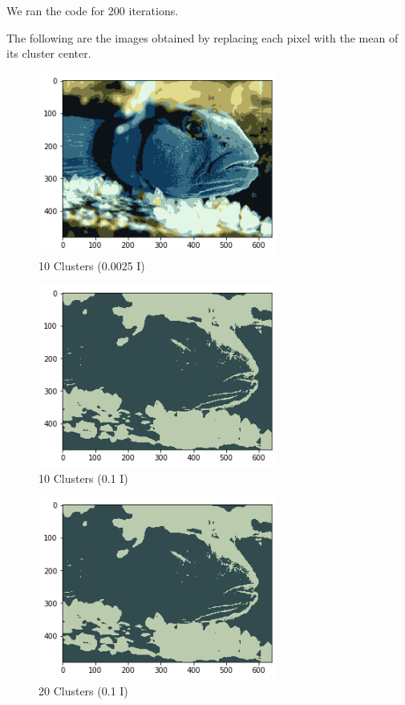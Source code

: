 \documentclass{article}      %
\begin{document}
We ran the code for 200 iterations. 

The following are the images obtained by replacing each pixel with the mean of its cluster center. 

\begin{figure}[H]
\centering
\includegraphics[width=0.7\textwidth]{fish_partc_means_10_400}
\caption{10 Clusters (0.0025 I)}
\end{figure}

\begin{figure}[H]
\centering
\includegraphics[width=0.7\textwidth]{fish_partc_means_10}
\caption{10 Clusters (0.1 I)}
\end{figure}

   
\begin{figure}[H]
\centering
\includegraphics[width=0.7\textwidth]{fish_partc_means_20}
\caption{20 Clusters (0.1 I)}
\end{figure}
\end{document}
